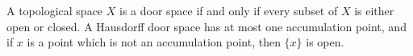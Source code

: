 A topological space $X$ is a door space if and only if every subset of $X$ is either open or closed. A Hausdorff door space has at most one accumulation point, and if $x$ is a point which is not an accumulation point, then $\{x\}$ is open.

